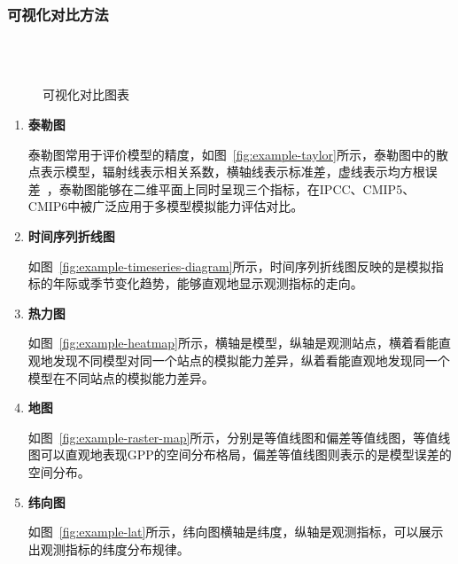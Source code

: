 \subsubsection{可视化对比方法}
\begin{figure}[!htbp]
    \centering
    \hfill
     \\ 
    \\
    \hfill
    \caption{可视化对比图表}
    \label{fig:ms-server-microservice}
\end{figure}
\begin{enumerate}[(1)]
\item \textbf{泰勒图}

泰勒图常用于评价模型的精度，如图~\ref{fig:example-taylor}所示，泰勒图中的散点表示模型，辐射线表示相关系数，横轴线表示标准差，虚线表示均方根误差~\cite{taylor2001summarizing}，泰勒图能够在二维平面上同时呈现三个指标，在IPCC、CMIP5、CMIP6中被广泛应用于多模型模拟能力评估对比。

\item \textbf{时间序列折线图}

如图~\ref{fig:example-timeseries-diagram}所示，时间序列折线图反映的是模拟指标的年际或季节变化趋势，能够直观地显示观测指标的走向。

\item \textbf{热力图}

如图~\ref{fig:example-heatmap}所示，横轴是模型，纵轴是观测站点，横着看能直观地发现不同模型对同一个站点的模拟能力差异，纵着看能直观地发现同一个模型在不同站点的模拟能力差异。

\item \textbf{地图}

如图~\ref{fig:example-raster-map}所示，分别是等值线图和偏差等值线图，等值线图可以直观地表现GPP的空间分布格局，偏差等值线图则表示的是模型误差的空间分布。

\item \textbf{纬向图}

如图~\ref{fig:example-lat}所示，纬向图横轴是纬度，纵轴是观测指标，可以展示出观测指标的纬度分布规律。

\end{enumerate}


